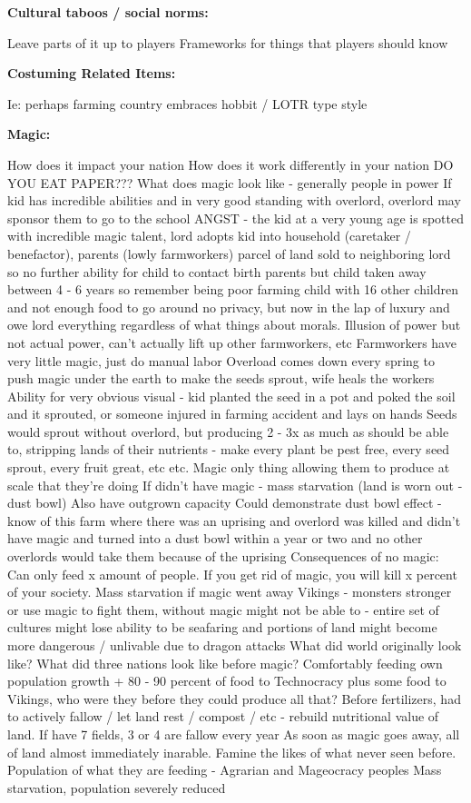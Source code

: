 \documentclass[blue]{GL2020}
\begin{document}
\textbf{Cultural taboos / social norms:}

Leave parts of it up to players
Frameworks for things that players should know

\textbf{Costuming Related Items:}

Ie: perhaps farming country embraces hobbit / LOTR type style

\textbf{Magic:}

How does it impact your nation
How does it work differently in your nation
DO YOU EAT PAPER???
What does magic look like - generally people in power
If kid has incredible abilities and in very good standing with overlord, overlord may sponsor them to go to the school
ANGST - the kid at a very young age is spotted with incredible magic talent, lord adopts kid into household (caretaker / benefactor), parents (lowly farmworkers) parcel of land sold to neighboring lord so no further ability for child to contact birth parents but child taken away between 4 - 6 years so remember being poor farming child with 16 other children and not enough food to go around no privacy, but now in the lap of luxury and owe lord everything regardless of what things about morals.  
Illusion of power but not actual power, can’t actually lift up other farmworkers, etc
Farmworkers have very little magic, just do manual labor
Overload comes down every spring to push magic under the earth to make the seeds sprout, wife heals the workers
Ability for very obvious visual - kid planted the seed in a pot and poked the soil and it sprouted, or someone injured in farming accident and lays on hands
Seeds would sprout without overlord, but producing 2 - 3x as much as should be able to, stripping lands of their nutrients - make every plant be pest free, every seed sprout, every fruit great, etc etc.  Magic only thing allowing them to produce at scale that they’re doing
If didn’t have magic - mass starvation (land is worn out - dust bowl)  Also have outgrown capacity
Could demonstrate dust bowl effect - know of this farm where there was an uprising and overlord was killed and didn’t have magic and turned into a dust bowl within a year or two and no other overlords would take them because of the uprising
Consequences of no magic:
Can only feed x amount of people.  If you get rid of magic, you will kill x percent of your society.  Mass starvation if magic went away
Vikings - monsters stronger or use magic to fight them, without magic might not be able to - entire set of cultures might lose ability to be seafaring and portions of land might become more dangerous / unlivable due to dragon attacks
What did world originally look like?  What did three nations look like before magic?
Comfortably feeding own population growth + 80 - 90 percent of food to Technocracy plus some food to Vikings, who were they before they could produce all that?
Before fertilizers, had to actively fallow / let land rest / compost / etc - rebuild nutritional value of land.  If have 7 fields, 3 or 4 are fallow every year
As soon as magic goes away, all of land almost immediately inarable.  Famine the likes of what never seen before.  Population of what they are feeding - Agrarian and Mageocracy peoples
Mass starvation, population severely reduced
\end{document}
